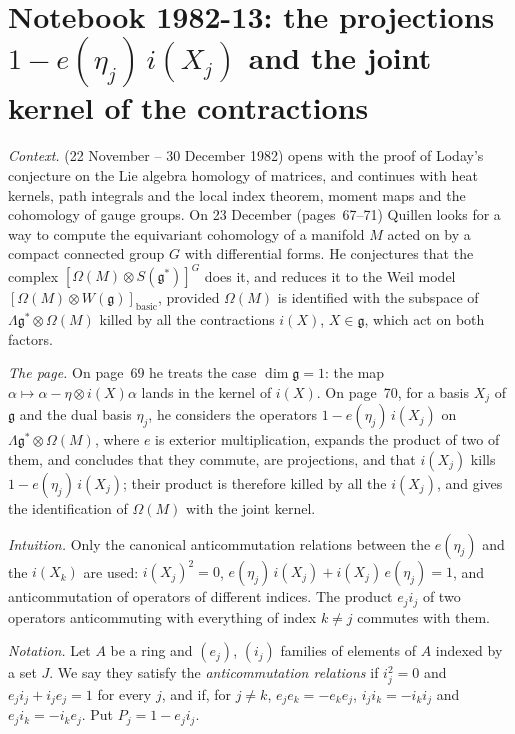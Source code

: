 \section[Notebook 1982-13: the projections $1 - e(\eta_j)\,i(X_j)$]{Notebook 1982-13: the projections $1 - e(\eta_j)\,i(X_j)$ and the joint kernel of the contractions\protect{}}\label{sec:quillen-1982-13}

\emph{Context.}  (22 November -- 30 December 1982) opens with the proof of Loday's conjecture on the Lie algebra homology of matrices, and continues with heat kernels, path integrals and the local index theorem, moment maps and the cohomology of gauge groups. On 23 December (pages~67--71) Quillen looks for a way to compute the equivariant cohomology of a manifold $M$ acted on by a compact connected group $G$ with differential forms. He conjectures that the complex $[\Omega(M) \otimes S(\mathfrak g^*)]^G$ does it, and reduces it to the Weil model $[\Omega(M) \otimes W(\mathfrak g)]_{\mathrm{basic}}$, provided $\Omega(M)$ is identified with the subspace of $\Lambda\mathfrak g^* \otimes \Omega(M)$ killed by all the contractions $i(X)$, $X \in \mathfrak g$, which act on both factors.

\emph{The page.} On page~69 he treats the case $\dim \mathfrak g = 1$: the map $\alpha \mapsto \alpha - \eta \otimes i(X)\alpha$ lands in the kernel of $i(X)$. On page~70, for a basis $X_j$ of $\mathfrak g$ and the dual basis $\eta_j$, he considers the operators $1 - e(\eta_j)\,i(X_j)$ on $\Lambda\mathfrak g^* \otimes \Omega(M)$, where $e$ is exterior multiplication, expands the product of two of them, and concludes that they commute, are projections, and that $i(X_j)$ kills $1 - e(\eta_j)\,i(X_j)$; their product is therefore killed by all the $i(X_j)$, and gives the identification of $\Omega(M)$ with the joint kernel.

\emph{Intuition.} Only the canonical anticommutation relations between the $e(\eta_j)$ and the $i(X_k)$ are used: $i(X_j)^2 = 0$, $e(\eta_j)\,i(X_j) + i(X_j)\,e(\eta_j) = 1$, and anticommutation of operators of different indices. The product $e_j i_j$ of two operators anticommuting with everything of index $k \ne j$ commutes with them.

\emph{Notation.} Let $A$ be a ring and $(e_j)$, $(i_j)$ families of elements of $A$ indexed by a set $J$. We say they satisfy the \emph{anticommutation relations} if $i_j^2 = 0$ and $e_j i_j + i_j e_j = 1$ for every $j$, and if, for $j \ne k$, $e_j e_k = -e_k e_j$, $i_j i_k = -i_k i_j$ and $e_j i_k = -i_k e_j$. Put $P_j = 1 - e_j i_j$.

